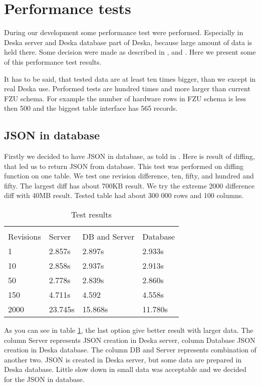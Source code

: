 \documentclass[deska]{subfiles}
\begin{document}
\section{Performance tests}
\label{sec:performance}

During our development some performance test were performed. Especially in Deska server and Deska database
part of Deska, because large amount of data is held there. Some decision were made as described in
,  and .
Here we present some of this performance test results.

It has to be said, that tested data are at least ten times bigger, than we
except in real Deska use. Performed tests are hundred times and more larger
than current FZU schema.
For example the number of hardware rows in FZU schema is less then 500 
and the biggest table interface has 565 records.

\subsection{JSON in database}
\label{sec:test-json}
Firstly we decided to have JSON in database, as told in .
Here is result of diffing, that led us to
return JSON from database.
This test was performed on diffing function on one table.
We test one revision difference, ten, fifty, and hundred and fifty.
The largest diff has about 700KB result.
We try the extreme 2000 difference diff with 40MB result.
Tested table had about 300 000 rows and 100 columns.

\begin{longtable}{ l | l | l | l}
\label{test:json}
\caption{Test results}\\
Revisions & Server & DB and Server & Database \\
\hline
\endhead
1 & 2.857s & 2.897s & 2.933s \\
10 & 2.858s & 2.937s & 2.913s \\
50 & 2.778s & 2.839s & 2.860s \\
150 & 4.711s & 4.592 & 4.558s \\
2000 & 23.745s & 15.868s & 11.780s \\
\end{longtable}

As you can see in table \ref{test:json}, the last option give better result with larger data.
The column Server represents JSON creation in Deska server, column Database JSON creation in
Deska database. The column DB and Server represents combination of another two. JSON is created
in Deska server, but some data are prepared in Deska database.
Little slow down in small data was acceptable and we decided for the JSON in database.
\end{document}
